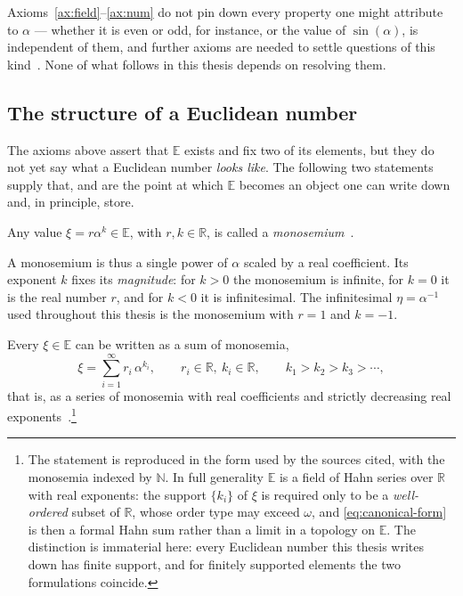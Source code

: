 \begin{remark}
Axioms~\ref{ax:field}--\ref{ax:num} do not pin down every property one might
attribute to $\alpha$ --- whether it is even or odd, for instance, or the value of
$\sin(\alpha)$, is independent of them, and further axioms are needed to settle
questions of this kind~\cite{benci2019measure,benci2022nonstandard}. None of what
follows in this thesis depends on resolving them.
\end{remark}

\subsection{The structure of a Euclidean number}
\label{sec:euclidean-structure}

The axioms above assert that $\mathbb{E}$ exists and fix two of its elements, but
they do not yet say what a Euclidean number \emph{looks like}. The following two
statements supply that, and are the point at which $\mathbb{E}$ becomes an object one
can write down and, in principle, store.

\begin{definition}[Monosemium]
\label{def:monosemium}
Any value $\xi = r\alpha^{k} \in \mathbb{E}$, with $r,k \in \mathbb{R}$, is called a
\emph{monosemium}~\cite{fiaschi2024informed}.
\end{definition}

A monosemium is thus a single power of $\alpha$ scaled by a real coefficient. Its
exponent $k$ fixes its \emph{magnitude}: for $k>0$ the monosemium is infinite, for
$k=0$ it is the real number $r$, and for $k<0$ it is infinitesimal. The infinitesimal
$\eta = \alpha^{-1}$ used throughout this thesis is the monosemium with $r=1$ and
$k=-1$.

\begin{theorem}
\label{thm:canonical-form}
Every $\xi \in \mathbb{E}$ can be written as a sum of monosemia,
\begin{equation}
  \label{eq:canonical-form}
  \xi = \sum_{i=1}^{\infty} r_i\,\alpha^{k_i},
  \qquad r_i \in \mathbb{R},\ k_i \in \mathbb{R},
  \qquad k_1 > k_2 > k_3 > \cdots,
\end{equation}
that is, as a series of monosemia with real coefficients and strictly decreasing real
exponents~\cite{fiaschi2024informed,benci2022nonstandard}.\footnote{The statement is
reproduced in the form used by the sources cited, with the monosemia indexed by
$\mathbb{N}$. In full generality $\mathbb{E}$ is a field of Hahn series over
$\mathbb{R}$ with real exponents: the support $\{k_i\}$ of $\xi$ is required only to
be a \emph{well-ordered} subset of $\mathbb{R}$, whose order type may exceed $\omega$,
and \eqref{eq:canonical-form} is then a formal Hahn sum rather than a limit in a
topology on $\mathbb{E}$. The distinction is immaterial here: every Euclidean number
this thesis writes down has finite support, and for finitely supported elements the
two formulations coincide.}
\end{theorem}

